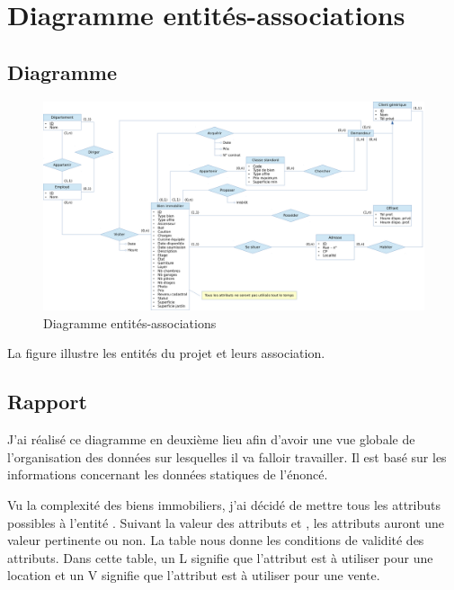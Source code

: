 \chapter{Diagramme entités-associations}

\section{Diagramme}

\begin{figure}
  \centering
  \includegraphics[angle=90,height=0.99\textheight]{IMG/er}
  \caption{Diagramme entités-associations}
  \label{img_er}
\end{figure}

La figure  illustre les entités du projet et leurs association.

\section{Rapport}

J'ai réalisé ce diagramme en deuxième lieu afin d'avoir une vue globale de l'organisation des données sur lesquelles il va falloir travailler. Il est basé sur les informations concernant les données statiques de l'énoncé.

Vu la complexité des biens immobiliers, j'ai décidé de mettre tous les attributs possibles à l'entité . Suivant la valeur des attributs  et , les attributs auront une valeur pertinente ou non. La table  nous donne les conditions de validité des attributs. Dans cette table, un \og{}L\fg{} signifie que l'attribut est à utiliser pour une location et un \og{}V\fg{} signifie que l'attribut est à utiliser pour une vente.

